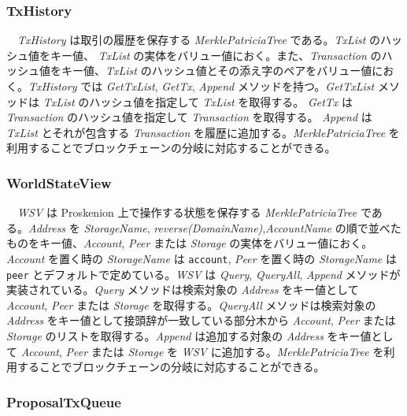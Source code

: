 \hypertarget{txhistory}{%
\subsubsection{TxHistory}\label{txhistory}}

　\emph{TxHistory} は取引の履歴を保存する \emph{MerklePatriciaTree}
である。\emph{TxList} のハッシュ値をキー値、 \emph{TxList}
の実体をバリュー値におく。また、\emph{Transaction}
のハッシュ値をキー値、\emph{TxList}
のハッシュ値とその添え字のペアをバリュー値におく。\emph{TxHistory} では
\emph{GetTxList}, \emph{GetTx}, \emph{Append}
メソッドを持つ。\emph{GetTxList} メソッドは \emph{TxList}
のハッシュ値を指定して \emph{TxList} を取得する。 \emph{GetTx} は
\emph{Transaction} のハッシュ値を指定して \emph{Transaction}
を取得する。 \emph{Append} は \emph{TxList} とそれが包含する
\emph{Transaction} を履歴に追加する。\emph{MerklePatriciaTree}
を利用することでブロックチェーンの分岐に対応することができる。

\hypertarget{worldstateview}{%
\subsubsection{WorldStateView}\label{worldstateview}}

　\emph{WSV} は Proskenion 上で操作する状態を保存する
\emph{MerklePatriciaTree} である。\emph{Address} を \emph{StorageName},
\emph{reverse(DomainName)},\emph{AccountName}
の順で並べたものをキー値、\emph{Account}, \emph{Peer} または
\emph{Storage} の実体をバリュー値におく。\emph{Account} を置く時の
\emph{StorageName} は \texttt{account}, \emph{Peer} を置く時の
\emph{StorageName} は \texttt{peer} とデフォルトで定めている。\emph{WSV}
は \emph{Query}, \emph{QueryAll}, \emph{Append}
メソッドが実装されている。\emph{Query} メソッドは検索対象の
\emph{Address} をキー値として \emph{Account}, \emph{Peer} または
\emph{Storage} を取得する。\emph{QueryAll} メソッドは検索対象の
\emph{Address} をキー値として接頭辞が一致している部分木から
\emph{Account}, \emph{Peer} または \emph{Storage}
のリストを取得する。\emph{Append} は追加する対象の \emph{Address}
をキー値として \emph{Account}, \emph{Peer} または \emph{Storage} を
\emph{WSV} に追加する。\emph{MerklePatriciaTree}
を利用することでブロックチェーンの分岐に対応することができる。

\hypertarget{proposaltxqueue}{%
\subsubsection{ProposalTxQueue}\label{proposaltxqueue}}

